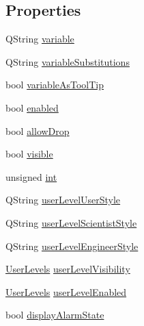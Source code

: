 \subsection*{Properties}
\begin{DoxyCompactItemize}
\item 
QString \hyperlink{classQEBitStatus_a1025f61dcda8397905e8d46b7efdb577}{variable}
\item 
QString \hyperlink{classQEBitStatus_af0acd3f853414840397c1694cd77442b}{variableSubstitutions}
\item 
bool \hyperlink{classQEBitStatus_abf44a21340aa190bdc1058802f9c8f87}{variableAsToolTip}
\item 
bool \hyperlink{classQEBitStatus_a863f17f538fe93d84c5e3f2f315bc0de}{enabled}
\item 
bool \hyperlink{classQEBitStatus_aa507f49e6c2ed6d62f83eadc9451b75c}{allowDrop}
\item 
bool \hyperlink{classQEBitStatus_a1fe8291617d365852f3e43a81a728c0c}{visible}
\item 
unsigned \hyperlink{classQEBitStatus_a1c3dc5a78cc729b1476148f89018f275}{int}
\item 
QString \hyperlink{classQEBitStatus_ab79cc284ddbcd52a98e74cab7b590739}{userLevelUserStyle}
\item 
QString \hyperlink{classQEBitStatus_ae5d057164351722b3d0f9847daa36f9b}{userLevelScientistStyle}
\item 
QString \hyperlink{classQEBitStatus_acca0e670c1c589dcad2afd499d2f2336}{userLevelEngineerStyle}
\item 
\hyperlink{classQEBitStatus_a3b7b2b21622eff585577c6ab1b90b5ed}{UserLevels} \hyperlink{classQEBitStatus_af9179749c38691f33cdcf1f8de7d3e3d}{userLevelVisibility}
\item 
\hyperlink{classQEBitStatus_a3b7b2b21622eff585577c6ab1b90b5ed}{UserLevels} \hyperlink{classQEBitStatus_aaf35e62560528034f4d2dd67256c5fba}{userLevelEnabled}
\item 
bool \hyperlink{classQEBitStatus_a5a84d6ec6d0e3855f2cd7936a3678341}{displayAlarmState}
\end{DoxyCompactItemize}


